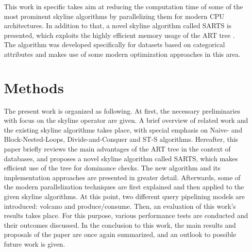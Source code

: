 This work in specific takes aim at reducing the computation time of some of the most prominent skyline algorithms by parallelizing them for modern CPU architectures. In addition to that, a novel skyline algorithm called SARTS is presented, which exploits the highly efficient memory usage of the ART tree \cite{art}. The algorithm was developed specifically for datasets based on categorical attributes and makes use of some modern optimization approaches in this area. 

\section{Methods}
The present work is organized as following. At first, the necessary preliminaries with focus on the skyline operator are given. A brief overview of related work and the existing skyline algorithms takes place, with special emphasis on Naive- and Block-Nested-Loops, Divide-and-Conquer and ST-S algorithms. Hereafter, this paper briefly reviews the main advantages of the ART tree in the context of databases, and proposes a novel skyline algorithm called SARTS, which makes efficient use of the tree for dominance checks. The new algorithm and its implementation approaches are presented in greater detail. Afterwards, some of the modern parallelization techniques are first explained and then applied to the given skyline algorithms. At this point, two different query pipelining models are introduced: volcano and produce/consume. Then, an evaluation of this work's results takes place. For this purpose, various performance tests are conducted and their outcomes discussed. In the conclusion to this work, the main results and proposals of the paper are once again summarized, and an outlook to possible future work is given. 
 


